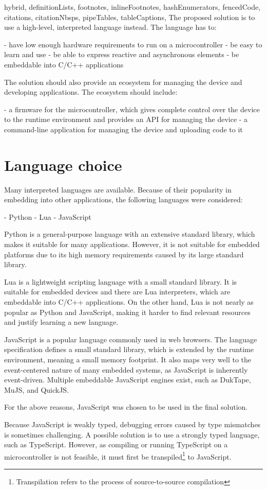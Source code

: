 \begin{markdown*}{%
  hybrid,
  definitionLists,
  footnotes,
  inlineFootnotes,
  hashEnumerators,
  fencedCode,
  citations,
  citationNbsps,
  pipeTables,
  tableCaptions,
}
The proposed solution is to use a high-level, interpreted language instead. The language has to:

  - have low enough hardware requirements to run on a microcontroller
  - be easy to learn and use
  - be able to express reactive and asynchronous elements
  - be embeddable into C/C++ applications

The solution should also provide an ecosystem for managing the device and developing applications. The ecosystem should include:

  - a firmware for the microcontroller, which gives complete control over the device to the runtime environment and provides an API for managing the device
  - a command-line application for managing the device and uploading code to it

\section{Language choice}

Many interpreted languages are available. Because of their popularity in embedding into other applications, the following languages were considered:

  - Python
  - Lua
  - JavaScript

Python is a general-purpose language with an extensive standard library, which makes it suitable for many applications. However, it is not suitable for embedded platforms due to its high memory requirements caused by its large standard library.

Lua is a lightweight scripting language with a small standard library. It is suitable for embedded devices and there are Lua interpreters, which are embeddable into C/C++ applications. On the other hand, Lua is not nearly as popular as Python and JavaScript, making it harder to find relevant resources and justify learning a new language.

JavaScript is a popular language commonly used in web browsers. The language specification defines a small standard library, which is extended by the runtime environment, meaning a small memory footprint. It also maps very well to the event-centered nature of many embedded systems, as JavaScript is inherently event-driven. Multiple embeddable JavaScript engines exist, such as DukTape, MuJS, and QuickJS.

For the above reasons, JavaScript was chosen to be used in the final solution.

Because JavaScript is weakly typed, debugging errors caused by type mismatches is sometimes challenging. A possible solution is to use a strongly typed language, such as TypeScript. However, as compiling or running TypeScript on a microcontroller is not feasible, it must first be transpiled\footnote{Transpilation refers to the process of source-to-source compilation} to JavaScript.



\end{markdown*}
